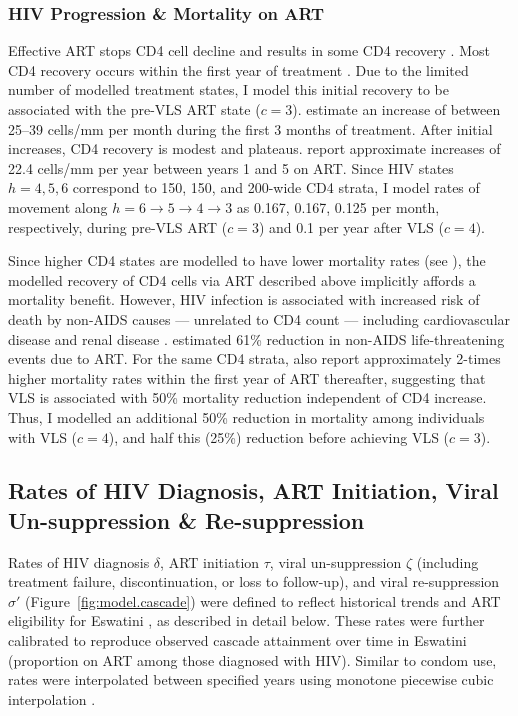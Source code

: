 \subsubsection{HIV Progression \& Mortality on ART}\label{model.par.art.hiv}
\def\hunprog{$h = 6 \rightarrow 5 \rightarrow 4 \rightarrow 3$\xspace}
Effective ART stops CD4 cell decline and results in some CD4 recovery \cite{Battegay2006,Lawn2006}.
Most CD4 recovery occurs within the first year of treatment \cite{Battegay2006}.
Due to the limited number of modelled treatment states,
I model this initial recovery to be associated with the pre-VLS ART state ($c=3$).
\citet{Lawn2006,Gabillard2013} estimate an increase of between 25--39 cells/mm per month
during the first 3 months of treatment.
After initial increases, CD4 recovery is modest and plateaus.
\citet{Battegay2006} report approximate increases of
22.4 cells/mm per year between years 1 and 5 on ART.
Since HIV states $h=4,5,6$ correspond to 150, 150, and 200-wide CD4 strata,
I model rates of movement along \hunprog as
0.167, 0.167, 0.125 per month, respectively, during pre-VLS ART ($c=3$) and
0.1 per year after VLS ($c=4$).
\par
Since higher CD4 states are modelled to have lower mortality rates (see ),
the modelled recovery of CD4 cells via ART described above implicitly affords a mortality benefit.
However, HIV infection is associated with increased risk of death by non-AIDS causes
--- \ie unrelated to CD4 count ---
including cardiovascular disease and renal disease \cite{Phillips2008}.
\citet{Lundgren2015} estimated 61\% reduction in non-AIDS life-threatening events due to ART.
For the same CD4 strata, \citet{Gabillard2013} also report approximately 2-times higher
mortality rates within the first year of ART \vs thereafter,
suggesting that VLS is associated with 50\% mortality reduction independent of CD4 increase.
Thus, I modelled an additional 50\% reduction in mortality among individuals with VLS ($c=4$),
and half this (25\%) reduction before achieving VLS ($c=3$).
\subsection{Rates of HIV Diagnosis, ART Initiation, Viral Un-suppression \& Re-suppression}\label{model.par.cascade}
Rates of HIV diagnosis $\delta$, ART initiation $\tau$, viral un-suppression $\zeta$
(including treatment failure, discontinuation, or loss to follow-up),
and viral re-suppression $\sigma'$ (Figure~\ref{fig:model.cascade})
were defined to reflect historical trends and ART eligibility for Eswatini
\cite{EswMOH2006,EswMOH2010,EswMOH2015,EswMOH2018}, as described in detail below.
These rates were further calibrated to reproduce observed cascade attainment over time in Eswatini
(\eg proportion on ART among those diagnosed with HIV).
Similar to condom use, rates were interpolated between specified years
using monotone piecewise cubic interpolation \cite{Fritsch1980}.
